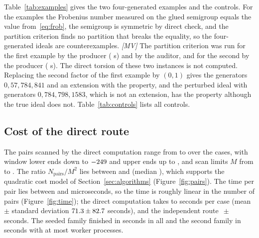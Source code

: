 \documentclass[11pt]{article}
\theoremstyle{definition}
\theoremstyle{remark}
\newcommand{\mMV}{\emph{[MV]}}
\begin{document}
Table~\ref{tab:examples} gives the two four-generated examples and the controls. For the examples the Frobenius number measured on the glued semigroup equals the value from~\eqref{eq:frob}, the
semigroup is symmetric by direct check, and the partition criterion finds no partition that breaks the equality, so the four-generated ideals are counterexamples. \mMV{} The partition criterion
was run for the first example by the producer (\PhamSeconds{} s) and by the auditor, and for the second by the producer (\MixedSeconds{} s). The direct torsion of these two instances is not computed.
Replacing the second factor of the first example by $(0,1)$ gives the generators $0,57,784,841$ and an extension with the property, and the perturbed ideal with generators $0,784,798,1583$, which
is not an extension, has the property although the true ideal does not. Table~\ref{tab:controls} lists all controls.

\begin{table}[t]
\centering\footnotesize

\caption{The two four-generated counterexamples, the control with a factor that has the property, and the perturbed ideal: multipliers, the measured Frobenius number and symmetry, the minimal generators of the ideal, $\mu$, and whether the ideal has the Huneke--Wiegand property.}\label{tab:examples}
\end{table}

\begin{table}[t]
\centering\footnotesize

\caption{The controls that remove or replace a hypothesis, with the instance and the outcome: without the gluing hypothesis the Hilbert identity fails, without the extension structure the
extension test rejects, and with a factor that has the property the extension has the property.}\label{tab:controls}
\end{table}

\subsection{Cost of the direct route}

The pairs scanned by the direct computation range from \HardPairsMin{} to \HardPairsMax{} over the \NHard{} cases, with window lower ends down to $-249{}$ and upper ends up to \HardWindowHi{}, and scan limits $M$
from \HardTopMin{} to \HardTopMax{}. The ratio $N_{\mathrm{pairs}}/M^2$ lies between \HardRatioMin{} and \HardRatioMax{} (median \HardRatioMedian{}), which supports the quadratic cost model of Section~\ref{sec:algorithms}
(Figure~\ref{fig:pairs}). The time per pair lies between \HardMicroMin{} and \HardMicroMax{} microseconds, so the time is roughly linear in the number of pairs
(Figure~\ref{fig:time}); the direct computation takes \HardTimeMin{} to \HardTimeMax{} seconds per case (mean $\pm$ standard deviation $71.3\pm82.7$ seconds), and the independent route
\HardAuditMean{}$\,\pm\,$\HardAuditSd{} seconds. The seeded family finished in \SeededSeconds{} seconds in all and the second family in \HardWall{} seconds with at most \HardWorkers{} worker processes.
\end{document}

